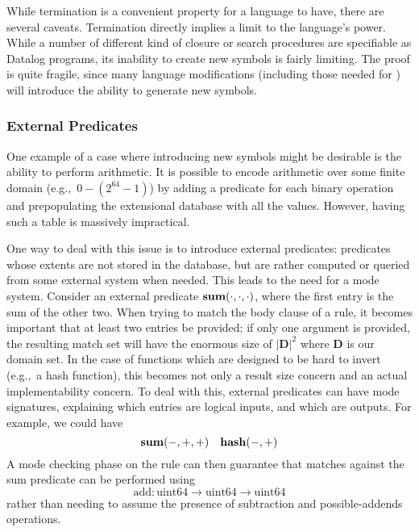 While termination is a convenient property for a language to have, there are several caveats.
%
Termination directly implies a limit to the language's power.
While a number of different kind of closure or search procedures are specifiable as Datalog programs, its inability to create new symbols is fairly limiting.
%
The proof is quite fragile, since many language modifications (including those needed for \sysname) will introduce the ability to generate new symbols.
\subsubsection{External Predicates}
\label{sec:extpred}
One example of a case where introducing new symbols might be desirable is the ability to perform arithmetic.
It is possible to encode arithmetic over some finite domain (e.g.,\ $0-(2^{64} - 1)$) by adding a predicate for each binary operation and prepopulating the extensional database with all the values.
However, having such a table is massively impractical.

One way to deal with this issue is to introduce external predicates: predicates whose extents are not stored in the database, but are rather computed or queried from some external system when needed.
This leads to the need for a mode system.
Consider an external predicate ${\bf sum}(\cdot, \cdot, \cdot)$, where the first entry is the sum of the other two.
When trying to match the body clause of a rule, it becomes important that at least two entries be provided; if only one argument is provided, the resulting match set will have the enormous size of $|\mathbf{D}|^2$ where $\mathbf{D}$ is our domain set.
In the case of functions which are designed to be hard to invert (e.g.,\ a hash function), this becomes not only a result size concern and an actual implementability concern.
To deal with this, external predicates can have mode signatures, explaining which entries are logical inputs, and which are outputs. For example, we could have
\[
        {\bf sum}(-, +, +) \quad {\bf hash}(-, +)
\]
A mode checking phase on the rule can then guarantee that matches against the sum predicate can be performed using
\[
        \textrm{add} : \textrm{uint64} \rightarrow \textrm{uint64} \rightarrow \textrm{uint64}
\]
rather than needing to assume the presence of subtraction and possible-addends operations.

